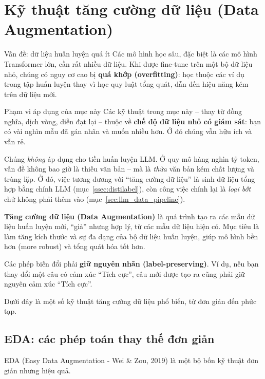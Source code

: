 
\section{Kỹ thuật tăng cường dữ liệu (Data Augmentation)}
\label{sec:data_augmentation}

\begin{pitfall}{Vấn đề: dữ liệu huấn luyện quá ít}
Các mô hình học sâu, đặc biệt là các mô hình Transformer lớn, cần rất nhiều dữ liệu. Khi được fine-tune trên một bộ dữ liệu nhỏ, chúng có nguy cơ cao bị \textbf{quá khớp (overfitting)}: học thuộc các ví dụ trong tập huấn luyện thay vì học quy luật tổng quát, dẫn đến hiệu năng kém trên dữ liệu mới.
\end{pitfall}

\begin{keyidea}{Phạm vi áp dụng của mục này}
Các kỹ thuật trong mục này -- thay từ đồng nghĩa, dịch vòng, diễn đạt lại -- thuộc về \textbf{chế độ dữ liệu nhỏ có giám sát}: bạn có vài nghìn mẫu đã gán nhãn và muốn nhiều hơn. Ở đó chúng vẫn hữu ích và vẫn rẻ.

Chúng \emph{không} áp dụng cho tiền huấn luyện LLM. Ở quy mô hàng nghìn tỷ token, vấn đề không bao giờ là thiếu văn bản -- mà là \emph{thừa} văn bản kém chất lượng và trùng lặp. Ở đó, việc tương đương với “tăng cường dữ liệu” là sinh dữ liệu tổng hợp bằng chính LLM (mục~\ref{ssec:distilabel}), còn công việc chính lại là \emph{loại bớt} chứ không phải thêm vào (mục~\ref{sec:llm_data_pipeline}).
\end{keyidea}

\textbf{Tăng cường dữ liệu (Data Augmentation)} là quá trình tạo ra các mẫu dữ liệu huấn luyện mới, “giả” nhưng hợp lý, từ các mẫu dữ liệu hiện có. Mục tiêu là làm tăng kích thước và sự đa dạng của bộ dữ liệu huấn luyện, giúp mô hình bền hơn (more robust) và tổng quát hóa tốt hơn.

Các phép biến đổi phải \textbf{giữ nguyên nhãn (label-preserving)}. Ví dụ, nếu bạn thay đổi một câu có cảm xúc “Tích cực”, câu mới được tạo ra cũng phải giữ nguyên cảm xúc “Tích cực”.

Dưới đây là một số kỹ thuật tăng cường dữ liệu phổ biến, từ đơn giản đến phức tạp.

\subsection{EDA: các phép toán thay thế đơn giản}
\label{ssec:eda}
EDA (Easy Data Augmentation - Wei \& Zou, 2019) là một bộ bốn kỹ thuật đơn giản nhưng hiệu quả.

